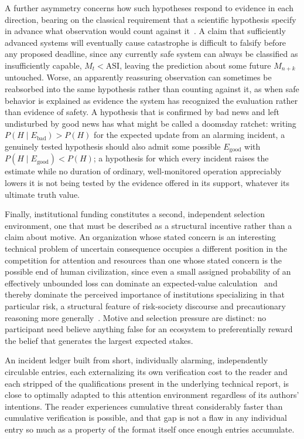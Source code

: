 \documentclass[11pt]{article}
\begin{document}
A further asymmetry concerns how such hypotheses respond to evidence in each direction, bearing on the classical requirement that a scientific hypothesis specify in advance what observation would count against it~\cite{popper1959}. A claim that sufficiently advanced systems will eventually cause catastrophe is difficult to falsify before any proposed deadline, since any currently safe system can always be classified as insufficiently capable, $M_t < \text{ASI}$, leaving the prediction about some future $M_{n+k}$ untouched. Worse, an apparently reassuring observation can sometimes be reabsorbed into the same hypothesis rather than counting against it, as when safe behavior is explained as evidence the system has recognized the evaluation rather than evidence of safety. A hypothesis that is confirmed by bad news and left undisturbed by good news has what might be called a doomsday ratchet: writing $P(H \mid E_{\text{bad}}) > P(H)$ for the expected update from an alarming incident, a genuinely tested hypothesis should also admit some possible $E_{\text{good}}$ with $P(H \mid E_{\text{good}}) < P(H)$; a hypothesis for which every incident raises the estimate while no duration of ordinary, well-monitored operation appreciably lowers it is not being tested by the evidence offered in its support, whatever its ultimate truth value.

Finally, institutional funding constitutes a second, independent selection environment, one that must be described as a structural incentive rather than a claim about motive. An organization whose stated concern is an interesting technical problem of uncertain consequence occupies a different position in the competition for attention and resources than one whose stated concern is the possible end of human civilization, since even a small assigned probability of an effectively unbounded loss can dominate an expected-value calculation~\cite{bostrom2013,ord2020} and thereby dominate the perceived importance of institutions specializing in that particular risk, a structural feature of risk-society discourse and precautionary reasoning more generally~\cite{beck1992,sunstein2005}. Motive and selection pressure are distinct: no participant need believe anything false for an ecosystem to preferentially reward the belief that generates the largest expected stakes.

An incident ledger built from short, individually alarming, independently circulable entries, each externalizing its own verification cost to the reader and each stripped of the qualifications present in the underlying technical report, is close to optimally adapted to this attention environment regardless of its authors' intentions. The reader experiences cumulative threat considerably faster than cumulative verification is possible, and that gap is not a flaw in any individual entry so much as a property of the format itself once enough entries accumulate.
\end{document}

